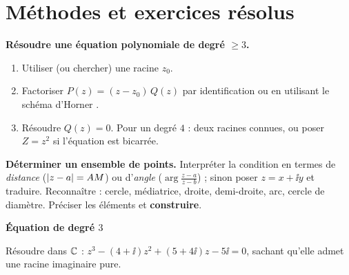 




\section{Méthodes et exercices résolus}

\begin{methode}
	\textbf{Résoudre une équation polynomiale de degré $\geqslant 3$.}
	\begin{enumerate}
		\item Utiliser (ou chercher) une racine $z_0$.
		\item Factoriser $P(z) = (z - z_0)\,Q(z)$ par identification ou en utilisant le schéma d'Horner .
		\item Résoudre $Q(z) = 0$. Pour un degré $4$ : deux racines connues, ou
		poser $Z = z^2$ si l'équation est bicarrée.
	\end{enumerate}
\end{methode}

\begin{methode}
	\textbf{Déterminer un ensemble de points.}
	Interpréter la condition en termes de \emph{distance} ($\left|z - a\right| = AM$)
	ou d'\emph{angle} ($\arg\frac{z - a}{z - b}$) ; sinon poser $z = x + \ii y$
	et traduire. Reconnaître : cercle, médiatrice, droite, demi-droite, arc,
	cercle de diamètre. Préciser les éléments et \textbf{construire}.
\end{methode}

\exerciceresolu
\textbf{Équation de degré $3$}

Résoudre dans $\mathbb{C}$ : $z^3 - (4 + \ii)z^2 + (5 + 4\ii)z - 5\ii = 0$, sachant
qu'elle admet une racine imaginaire pure.


